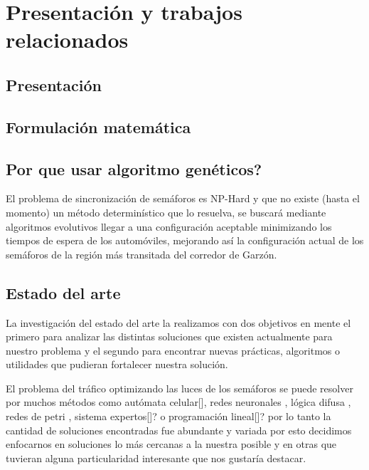 \chapter{Presentación y trabajos relacionados}

\section{Presentación}
\section{Formulación matemática}

\section{Por que usar algoritmo genéticos?}
El problema de sincronización de semáforos es NP-Hard y que
no existe (hasta el momento) un método determinístico que lo
resuelva, se buscará mediante algoritmos evolutivos llegar a
una configuración aceptable minimizando los tiempos de
espera de los automóviles, mejorando así la configuración
actual de los semáforos de la región más transitada del corredor
de Garzón.

\section{Estado del arte}
La investigación del estado del arte la realizamos con dos objetivos en mente el primero para analizar las distintas soluciones que existen actualmente para nuestro problema y el segundo para encontrar nuevas prácticas, algoritmos o utilidades que pudieran fortalecer nuestra solución.

El problema del tráfico optimizando las luces de los semáforos se puede resolver por muchos métodos como autómata celular[], redes neuronales \citep{Lopez1999}, lógica difusa \citep{Lim2001}, redes de petri \citep{DiFebbraro2002}, sistema expertos[]? o programación lineal[]? por lo tanto la cantidad de soluciones encontradas fue abundante y variada por esto decidimos enfocarnos en soluciones lo más cercanas a la nuestra posible y en otras que tuvieran alguna particularidad interesante que nos gustaría destacar.



